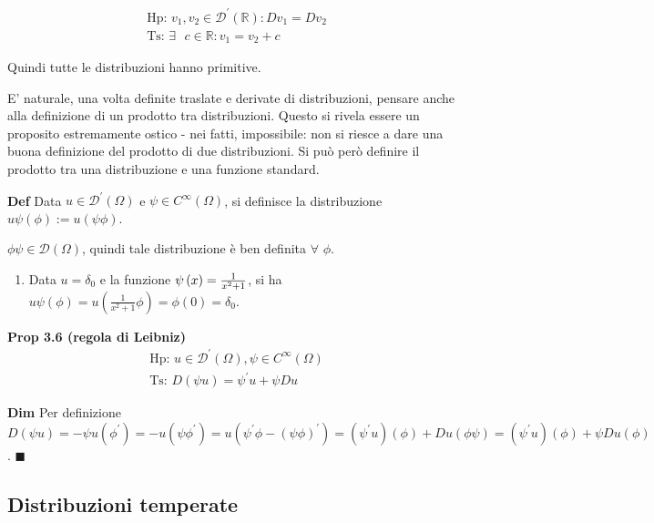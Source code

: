 \documentclass{article}
\begin{document}
\begin{gather*}
\text{Hp: }v_{1},v_{2}\in \mathcal{D}^{\prime }\left( 
\mathbb{R}
\right) :Dv_{1}=Dv_{2} \\
\text{Ts: }\exists \text{ }c\in 
\mathbb{R}
:v_{1}=v_{2}+c
\end{gather*}

Quindi tutte le distribuzioni hanno primitive.

E' naturale, una volta definite traslate e derivate di distribuzioni,
pensare anche alla definizione di un prodotto tra distribuzioni. Questo si
rivela essere un proposito estremamente ostico - nei fatti, impossibile: non
si riesce a dare una buona definizione del prodotto di due distribuzioni. Si
pu\`{o} per\`{o} definire il prodotto tra una distribuzione e una funzione
standard.

\textbf{Def} Data $u\in \mathcal{D}^{\prime }\left( \Omega \right) $ e $\psi
\in C^{\infty }\left( \Omega \right) $, si definisce la distribuzione $u\psi
\left( \phi \right) :=u\left( \psi \phi \right) $.

$\phi \psi \in \mathcal{D}\left( \Omega \right) $, quindi tale distribuzione 
\`{e} ben definita $\forall $ $\phi $.

\begin{enumerate}
\item Data $u=\delta _{0}$ e la funzione $\psi \left( x\right) =\frac{1}{%
x^{2}+1}$, si ha $u\psi \left( \phi \right) =u\left( \frac{1}{x^{2}+1}\phi
\right) =\phi \left( 0\right) =\delta _{0}$.
\end{enumerate}

\textbf{Prop 3.6 (regola di Leibniz)}%
\begin{gather*}
\text{Hp: }u\in \mathcal{D}^{\prime }\left( \Omega \right) ,\psi \in
C^{\infty }\left( \Omega \right) \\
\text{Ts: }D\left( \psi u\right) =\psi ^{\prime }u+\psi Du
\end{gather*}

\textbf{Dim} Per definizione $D\left( \psi u\right) =-\psi u\left( \phi
^{\prime }\right) =-u\left( \psi \phi ^{\prime }\right) =u\left( \psi
^{\prime }\phi -\left( \psi \phi \right) ^{\prime }\right) =\left( \psi
^{\prime }u\right) \left( \phi \right) +Du\left( \phi \psi \right) =\left(
\psi ^{\prime }u\right) \left( \phi \right) +\psi Du\left( \phi \right) $. $%
\blacksquare $

\subsection{Distribuzioni temperate}
\end{document}
